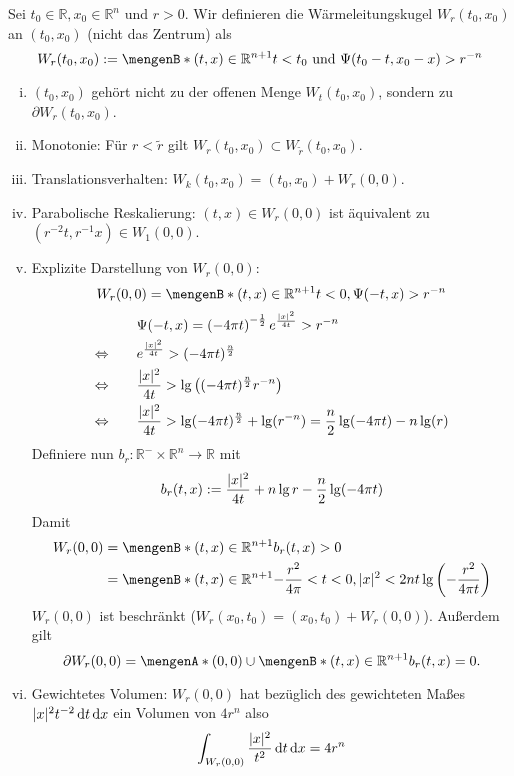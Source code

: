 \begin{definition}[Wärmeleitungskugel]
	Sei $t_0 \in \mathbb{R}, x_0 \in \mathbb{R}^n$ und $r >0$. Wir definieren die Wärmeleitungskugel $W_r(t_0,x_0)$ an $(t_0,x_0)$ (nicht das Zentrum) als
	\[
		W_r(t_0,x_0) := \set[(t,x) \in \mathbb{R}^{n+1}]{ t<t_0 \text{ und } \Psi(t_0-t, x_0-x)> r^{-n}}
	\]
\end{definition}
\begin{bemerkung}
	\begin{enumerate}[(i)]
		\item $(t_0,x_0)$ gehört nicht zu der offenen Menge $W_t(t_0,x_0)$, sondern zu $\partial W_r(t_0,x_0)$.
		\item Monotonie: Für $r < \tilde r$ gilt $ W_r(t_0,x_0) \subset W_{\tilde r}(t_0,x_0)$.
		\item Translationsverhalten: $W_k(t_0,x_0) = (t_0,x_0)+ W_r(0,0)$.
		\item Parabolische Reskalierung: $(t,x) \in W_r(0,0)$ ist äquivalent zu $( r^{-2}t, r^{-1}x) \in W_1(0,0)$.
		\item Explizite Darstellung von $W_r(0,0)$:
		\[
			W_r(0,0) = \set[(t,x) \in \mathbb{R}^{n+1}]{t<0, \Psi(-t,x)> r^{-n}}
		\] 
		\begin{align*}
			& \qquad \Psi(-t,x) = \left( -4 \pi t \right)^{- \frac{1}{2}} e^{\frac{\lvert x\rvert^2}{4t}} > r^{-n} \\
			\Leftrightarrow & \qquad e^{\frac{\lvert x\rvert^2}{4t}} > (-4 \pi t)^{\frac{n}{2}} \\
			\Leftrightarrow & \qquad \frac{\lvert x\rvert^2}{4t} > \lg \left( (-4 \pi t)^{\frac{n}{2}} r^{-n} \right) \\
			\Leftrightarrow & \qquad \frac{\lvert x\rvert^2}{4t} > \lg (-4 \pi t)^{\frac{n}{2}} + \lg (r^{-n}) = \frac{n}{2} \lg (-4 \pi t)- n \lg ( r)
		\end{align*}
		Definiere nun $b_r: \mathbb{R}^- \times \mathbb{R}^n \to \mathbb{R}$ mit
		\[
			b_r(t,x):= \frac{\lvert x\rvert^2}{4t} + n \lg r - \frac{n}{2} \lg(-4 \pi t)
		\]
		Damit
		\begin{align*}
			W_r(0,0) &= \set[(t,x) \in \mathbb{R}^{n+1}]{b_r(t,x)>0} \\
			&= \set[(t,x) \in \mathbb{R}^{n+1}]{- \frac{r^2}{4 \pi} < t < 0 , \abs{x}^2 < 2nt \lg \left( - \frac{r^2}{4 \pi t} \right)}
		\end{align*}
		$W_r(0,0)$ ist beschränkt ($W_r(x_0,t_0)= (x_0,t_0)+ W_r(0,0)$). Außerdem gilt
		\[
			\partial W_r(0,0) = \set{(0,0)} \cup \set[(t,x) \in \mathbb{R}^{n+1}]{b_r(t,x)=0}.
		\]
		\item Gewichtetes Volumen: $W_r(0,0)$ hat bezüglich des gewichteten Maßes $\lvert x\rvert^2 t^{-2} \, \mathrm{d}t \, \mathrm{d}x$ ein Volumen von $4 r^n$ also
		\[
			\int_{W_r(0,0)}^{} \frac{\lvert x\rvert^2}{t^2} \,\mathrm{d}t \, \mathrm{d}x = 4 r^n
		\]
	\end{enumerate}
\end{bemerkung}

